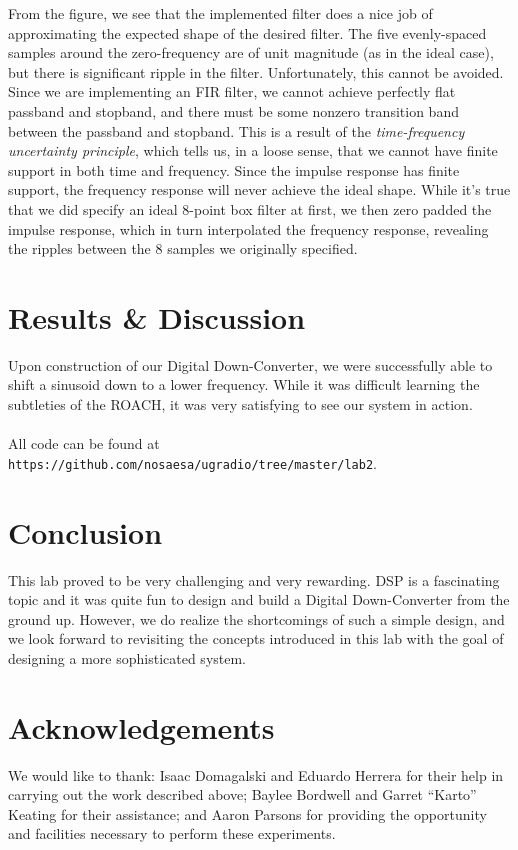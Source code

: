 \documentclass[11pt]{article}
\begin{document}
    \noindent From the figure, we see that the implemented filter does a nice job of approximating the expected shape of the desired filter. The five evenly-spaced samples around the zero-frequency are of unit magnitude (as in the ideal case), but there is significant ripple in the filter. Unfortunately, this cannot be avoided. Since we are implementing an FIR filter, we cannot achieve perfectly flat passband and stopband, and there must be some nonzero transition band between the passband and stopband. This is a result of the \emph{time-frequency uncertainty principle}, which tells us, in a loose sense, that we cannot have finite support in both time and frequency. Since the impulse response has finite support, the frequency response will never achieve the ideal shape. While it's true that we did specify an ideal 8-point box filter at first, we then zero padded the impulse response, which in turn interpolated the frequency response, revealing the ripples between the 8 samples we originally specified.

\section{Results \& Discussion}

Upon construction of our Digital Down-Converter, we were successfully able to shift a sinusoid down to a lower frequency. While it was difficult learning the subtleties of the ROACH, it was very satisfying to see our system in action. \\
\\
All code can be found at \texttt{https://github.com/nosaesa/ugradio/tree/master/lab2}.

\section{Conclusion}
This lab proved to be very challenging and very rewarding. DSP is a fascinating topic and it was quite fun to design and build a Digital Down-Converter from the ground up. However, we do realize the shortcomings of such a simple design, and we look forward to revisiting the concepts introduced in this lab with the goal of designing a more sophisticated system.

\section{Acknowledgements}
We would like to thank: Isaac Domagalski and Eduardo Herrera for their help in carrying out the work described above; Baylee Bordwell and Garret ``Karto'' Keating for their assistance; and Aaron Parsons for providing the opportunity and facilities necessary to perform these experiments.
\end{document}

